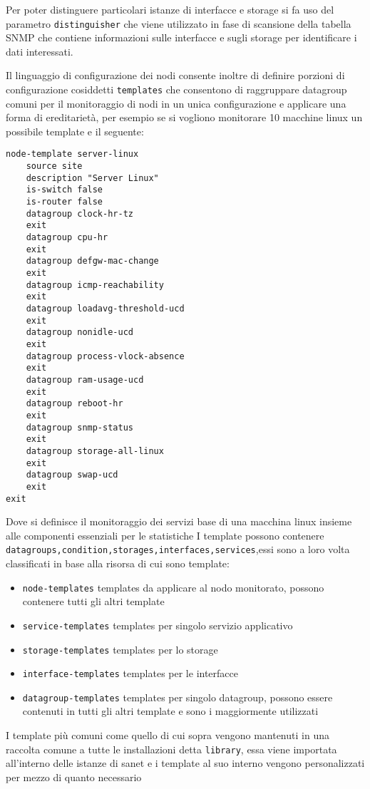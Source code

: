 \documentclass[12pt,a4paper,twoside,openright]{book}
\begin{document}
Per poter distinguere particolari istanze di interfacce e storage si fa uso del parametro \verb|distinguisher| che viene utilizzato in fase di scansione della tabella SNMP che contiene informazioni sulle interfacce e sugli storage per identificare i dati interessati.

Il linguaggio di configurazione dei nodi consente inoltre di definire porzioni di configurazione cosiddetti \verb|templates| che consentono di raggruppare datagroup comuni per il monitoraggio di nodi in un unica configurazione e applicare una forma di ereditarietà, per esempio se si vogliono monitorare 10 macchine linux un possibile template e il seguente:


\begin{lstlisting}
node-template server-linux
    source site
    description "Server Linux"
    is-switch false
    is-router false
    datagroup clock-hr-tz
    exit
    datagroup cpu-hr
    exit
    datagroup defgw-mac-change
    exit
    datagroup icmp-reachability
    exit
    datagroup loadavg-threshold-ucd
    exit
    datagroup nonidle-ucd
    exit
    datagroup process-vlock-absence
    exit
    datagroup ram-usage-ucd
    exit
    datagroup reboot-hr
    exit
    datagroup snmp-status
    exit
    datagroup storage-all-linux
    exit
    datagroup swap-ucd
    exit
exit
\end{lstlisting}

Dove si definisce il monitoraggio dei servizi base di una macchina linux insieme alle componenti essenziali per le statistiche
I template possono contenere \verb|datagroups,condition,storages,interfaces,services|,essi sono a loro volta classificati in base alla risorsa di cui sono template:

\begin{itemize}
  \item \verb|node-templates| templates da applicare al nodo monitorato, possono contenere tutti gli altri template
  \item \verb|service-templates| templates per singolo servizio applicativo
  \item \verb|storage-templates| templates per lo storage
  \item \verb|interface-templates| templates per le interfacce
  \item \verb|datagroup-templates| templates per singolo datagroup, possono essere contenuti in tutti gli altri template e sono i maggiormente utilizzati
\end{itemize}

I template più comuni come quello di cui sopra vengono mantenuti in una raccolta comune a tutte le installazioni detta \verb|library|, essa viene importata all'interno delle istanze di sanet e i template al suo interno vengono personalizzati per mezzo di quanto necessario
\end{document}
